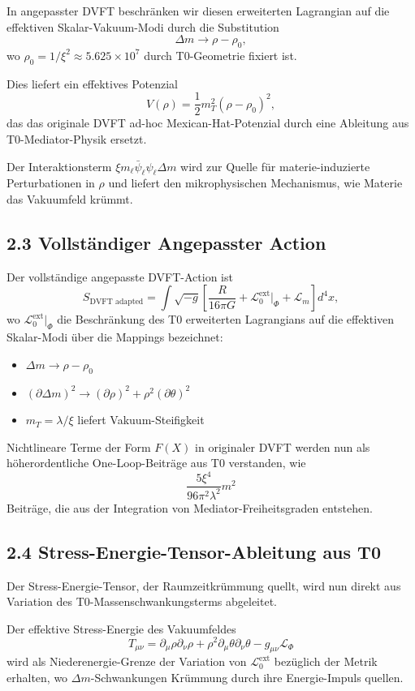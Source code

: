 	In angepasster DVFT beschränken wir diesen erweiterten Lagrangian auf die effektiven Skalar-Vakuum-Modi durch die Substitution
	\[
	\Delta m \to \rho - \rho_0,
	\]
	wo $\rho_0 = 1/\xi^2 \approx 5.625 \times 10^7$ durch T0-Geometrie fixiert ist.
	
	Dies liefert ein effektives Potenzial
	\[
	V(\rho) = \frac{1}{2} m_T^2 (\rho - \rho_0)^2,
	\]
	das das originale DVFT ad-hoc Mexican-Hat-Potenzial durch eine Ableitung aus T0-Mediator-Physik ersetzt.
	
	Der Interaktionsterm $\xi m_\ell \bar{\psi}_\ell \psi_\ell \Delta m$ wird zur Quelle für materie-induzierte Perturbationen in $\rho$ und liefert den mikrophysischen Mechanismus, wie Materie das Vakuumfeld krümmt.
	
	\subsection{2.3 Vollständiger Angepasster Action}
	
	Der vollständige angepasste DVFT-Action ist
	\[
	S_{\text{DVFT adapted}} = \int \sqrt{-g} \left[ \frac{R}{16\pi G} + \mathcal{L}_0^{\text{ext}} \big|_{\Phi} + \mathcal{L}_m \right] d^4x,
	\]
	wo $\mathcal{L}_0^{\text{ext}} \big|_{\Phi}$ die Beschränkung des T0 erweiterten Lagrangians auf die effektiven Skalar-Modi über die Mappings bezeichnet:
	\begin{itemize}
		\item $\Delta m \to \rho - \rho_0$
		\item $(\partial \Delta m)^2 \to (\partial \rho)^2 + \rho^2 (\partial \theta)^2$
		\item $m_T = \lambda / \xi$ liefert Vakuum-Steifigkeit
	\end{itemize}
	
	Nichtlineare Terme der Form $F(X)$ in originaler DVFT werden nun als höherordentliche One-Loop-Beiträge aus T0 verstanden, wie
	\[
	\frac{5\xi^4}{96\pi^2 \lambda^2} m^2
	\]
	Beiträge, die aus der Integration von Mediator-Freiheitsgraden entstehen.
	
	\subsection{2.4 Stress-Energie-Tensor-Ableitung aus T0}
	
	Der Stress-Energie-Tensor, der Raumzeitkrümmung quellt, wird nun direkt aus Variation des T0-Massenschwankungsterms abgeleitet.
	
	Der effektive Stress-Energie des Vakuumfeldes
	\[
	T_{\mu\nu} = \partial_\mu \rho \partial_\nu \rho + \rho^2 \partial_\mu \theta \partial_\nu \theta - g_{\mu\nu} \mathcal{L}_{\Phi}
	\]
	wird als Niederenergie-Grenze der Variation von $\mathcal{L}_0^{\text{ext}}$ bezüglich der Metrik erhalten, wo $\Delta m$-Schwankungen Krümmung durch ihre Energie-Impuls quellen.
	
